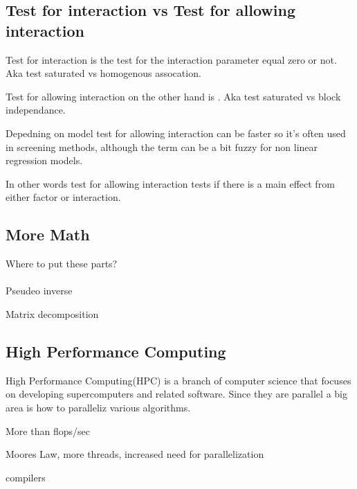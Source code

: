 \documentclass[10pt,a4paper]{article}
\begin{document}

\subsection{Test for interaction vs Test for allowing interaction}
\label{test_type}
Test for interaction is the test for the interaction parameter equal zero or not. Aka test saturated vs homogenous assocation\cite{boost_gene_gene}.

Test for allowing interaction on the other hand is . Aka test saturated vs block independance\cite{boost_gene_gene}.

Depedning on model test for allowing interaction can be faster so it's often used in screening methods, although the term can be a bit fuzzy for non linear regression models. \cite{cordell_detect_review}

In other words test for allowing interaction tests if there is a main effect from either factor or interaction.

\subsection{More Math}
Where to put these parts?\\
\\
Pseudeo inverse

Matrix decomposition

\clearpage
\subsection{High Performance Computing}
High Performance Computing(HPC) is a branch of computer science that focuses on developing supercomputers and related software. Since they are parallel a big area is how to paralleliz various algorithms.

More than flops/sec

Moores Law, more threads, increased need for parallelization

compilers\cite{intro_hpc}

\end{document}

